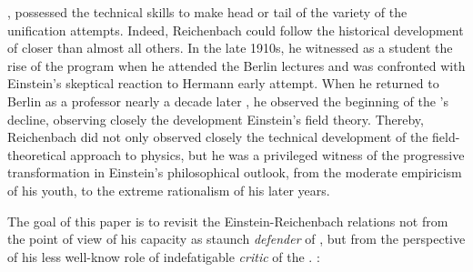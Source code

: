 \documentclass[draft]{article}
\newcommand{\FP}{\german{Fernparallelismus}\xspace}
\begin{document}
%


, possessed the technical skills to make head or tail of the variety of the unification attempts. Indeed, Reichenbach could follow the historical development of \uftp closer than almost all others. In the late 1910s, he witnessed as a student the rise of the program when he attended the Berlin lectures and was confronted with Einstein's skeptical reaction to Hermann  early attempt. When he returned to Berlin as a professor nearly a decade later , he observed the beginning of the \uftp's decline, observing closely the development Einstein's \FP field theory. Thereby, Reichenbach did not only observed closely the technical development of the field-theoretical approach to physics, but he was a privileged witness of the progressive transformation in Einstein's philosophical outlook, from the moderate empiricism of his youth, to the extreme rationalism of his later years.

The goal of this paper is to revisit the Einstein-Reichenbach relations not from the point of view of his capacity as staunch \emph{defender} of \rt \cite{Hentschel1982}, but from the perspective of his less well-know role of indefatigable \emph{critic} of the \uftp. :
\end{document}
